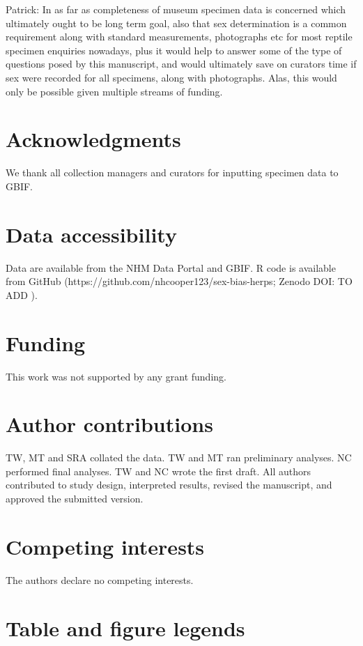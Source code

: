 \documentclass[a4paper, 12pt]{article}
\begin{document}
Patrick: In as far as completeness of museum specimen data is concerned which ultimately ought to be long term goal, also that sex determination is a common requirement along with standard measurements, photographs etc for most reptile specimen enquiries nowadays, plus it would help to answer some of the type of questions posed by this manuscript, and would ultimately save on curators time if sex were recorded for all specimens, along with photographs. Alas, this would only be possible given multiple streams of funding.  



\section{Acknowledgments}
We thank all collection managers and curators for inputting specimen data to GBIF.

\section{Data accessibility}\label{data-code-and-materials}
Data are available from the NHM Data Portal \cite{sex-bias-data-herps} and GBIF\cite{gbif-amphibians,gbif-reptiles}. 
R code is available from GitHub (https://github.com/nhcooper123/sex-bias-herps; Zenodo DOI: TO ADD \cite{coopercode2022}).

\section{Funding}
This work was not supported by any grant funding.

\section{Author contributions}
TW, MT and SRA collated the data. TW and MT ran preliminary analyses. NC performed final analyses. TW and NC wrote the first draft. All authors contributed to study design, interpreted results, revised the manuscript, and approved the submitted version.

\section{Competing interests}
The authors declare no competing interests.




\newpage
\section{Table and figure legends}
\end{document}
